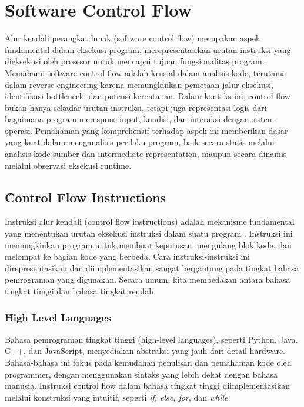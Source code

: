\section{\f{Software Control Flow}}
Alur kendali perangkat lunak (software control flow) merupakan aspek fundamental dalam eksekusi program, merepresentasikan urutan instruksi yang dieksekusi oleh prosesor untuk mencapai tujuan fungsionalitas program \cite{cod23}. Memahami software control flow adalah krusial dalam analisis kode, terutama dalam reverse engineering karena memungkinkan pemetaan jalur eksekusi, identifikasi bottleneck, dan potensi kerentanan. Dalam konteks ini, control flow bukan hanya sekadar urutan instruksi, tetapi juga representasi logis dari bagaimana program merespons input, kondisi, dan interaksi dengan sistem operasi. Pemahaman yang komprehensif terhadap aspek ini memberikan dasar yang kuat dalam menganalisis perilaku program, baik secara statis melalui analisis kode sumber dan intermediate representation, maupun secara dinamis melalui observasi eksekusi runtime.

\subsection{\f{Control Flow Instructions}}
Instruksi alur kendali (control flow instructions) adalah mekanisme fundamental yang menentukan urutan eksekusi instruksi dalam suatu program \cite{cod23}. Instruksi ini memungkinkan program untuk membuat keputusan, mengulang blok kode, dan melompat ke bagian kode yang berbeda. Cara instruksi-instruksi ini direpresentasikan dan diimplementasikan sangat bergantung pada tingkat bahasa pemrograman yang digunakan. Secara umum, kita membedakan antara bahasa tingkat tinggi dan bahasa tingkat rendah.

\subsubsection{\f{High Level Languages}}
Bahasa pemrograman tingkat tinggi (high-level languages), seperti Python, Java, C++, dan JavaScript, menyediakan abstraksi yang jauh dari detail hardware. Bahasa-bahasa ini fokus pada kemudahan penulisan dan pemahaman kode oleh programmer, dengan menggunakan sintaks yang lebih dekat dengan bahasa manusia. Instruksi control flow dalam bahasa tingkat tinggi diimplementasikan melalui konstruksi yang intuitif, seperti \textit{if, else, for}, dan \textit{while}.

